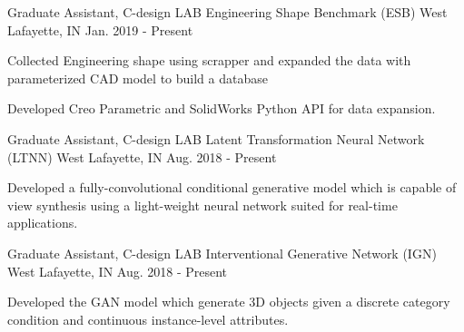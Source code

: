 


\begin{cventries}

\cventry
{Graduate Assistant, C-design LAB} %
{Engineering Shape Benchmark (ESB)} %
{West Lafayette, IN} %
{Jan. 2019 - Present} %
{ %
\begin{cvitems}
\item {Collected Engineering shape using scrapper and expanded the data with parameterized CAD model to build a database}
\item {Developed Creo Parametric and SolidWorks Python API for data expansion.}
\end{cvitems}
}


\cventry
{Graduate Assistant, C-design LAB} %
{Latent Transformation Neural Network (LTNN)} %
{West Lafayette, IN} %
{Aug. 2018 - Present} %
{ %
\begin{cvitems}
\item {Developed a fully-convolutional conditional generative model which is capable of view synthesis using a light-weight neural network suited for real-time applications.}
\end{cvitems}
}


\cventry
{Graduate Assistant, C-design LAB} %
{Interventional Generative Network (IGN)} %
{West Lafayette, IN} %
{Aug. 2018 - Present} %
{ %
\begin{cvitems}
\item {Developed the GAN model which generate 3D objects given a discrete
category condition and continuous instance-level attributes.}
\end{cvitems}
}


\end{cventries}
